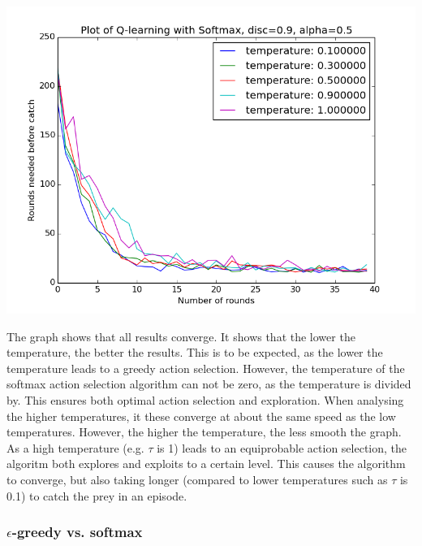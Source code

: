 \documentclass{article}
\begin{document}
\begin{center}
	\includegraphics[scale=0.4]{softmax_with_legend}
\end{center}

The graph shows that all results converge. It shows that the lower the temperature, the better the results. This is to be expected, as the lower the temperature leads to a greedy action selection. However, the temperature of the softmax action selection algorithm can not be zero, as the temperature is divided by. This ensures both optimal action selection and exploration. When analysing the higher temperatures, it these converge at about the same speed as the low temperatures. However, the higher the temperature, the less smooth the graph. As a high temperature (e.g. $\tau$ is 1) leads to an equiprobable action selection, the algoritm both explores and exploits to a certain level. This causes the algorithm to converge, but also taking longer (compared to lower temperatures such as $\tau$ is 0.1) to catch the prey in an episode.


\subsubsection{$\epsilon$-greedy vs. softmax}
\end{document}

